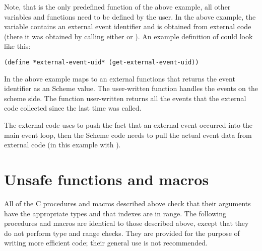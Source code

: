 Note, that  is the only predefined
function of the above example, all other variables and functions need
to be defined by the user.  In the above example, the variable
 contains an external event identifier and
is obtained from external code (there it was obtained by calling
either  or
).  An example definition
of  could look like this:

\begin{verbatim}
(define *external-event-uid* (get-external-event-uid))
\end{verbatim}

In the above example maps  to an external
functions that returns the event identifier as an Scheme value.  The
user-written function  handles the
events on the scheme side.  The function user-written
 returns all the events that the external
code collected since the last time  was
called.

The external code uses  to push the
fact that an external event occurred into the main event loop, then
the Scheme code needs to pull the actual event data from external code
(in this example with ).

\section{Unsafe functions and macros}

All of the C procedures and macros described above check that their
 arguments have the appropriate types and that indexes are in range.
The following procedures and macros are identical to those described
 above, except that they do not perform type and range checks.
They are provided for the purpose of writing more efficient code;
 their general use is not recommended.

